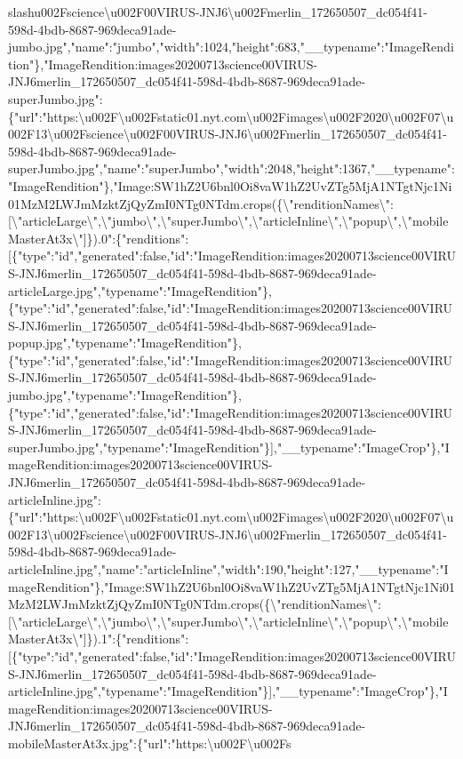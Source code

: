 slash{}u002Fscience\textbackslash{}u002F00VIRUS-JNJ6\textbackslash{}u002Fmerlin\_172650507\_dc054f41-598d-4bdb-8687-969deca91ade-jumbo.jpg","name":"jumbo","width":1024,"height":683,"\_\_typename":"ImageRendition"\},"ImageRendition:images20200713science00VIRUS-JNJ6merlin\_172650507\_dc054f41-598d-4bdb-8687-969deca91ade-superJumbo.jpg":\{"url":"https:\textbackslash{}u002F\textbackslash{}u002Fstatic01.nyt.com\textbackslash{}u002Fimages\textbackslash{}u002F2020\textbackslash{}u002F07\textbackslash{}u002F13\textbackslash{}u002Fscience\textbackslash{}u002F00VIRUS-JNJ6\textbackslash{}u002Fmerlin\_172650507\_dc054f41-598d-4bdb-8687-969deca91ade-superJumbo.jpg","name":"superJumbo","width":2048,"height":1367,"\_\_typename":"ImageRendition"\},"Image:SW1hZ2U6bnl0Oi8vaW1hZ2UvZTg5MjA1NTgtNjc1Ni01MzM2LWJmMzktZjQyZmI0NTg0NTdm.crops(\{\textbackslash{}"renditionNames\textbackslash{}":{[}\textbackslash{}"articleLarge\textbackslash{}",\textbackslash{}"jumbo\textbackslash{}",\textbackslash{}"superJumbo\textbackslash{}",\textbackslash{}"articleInline\textbackslash{}",\textbackslash{}"popup\textbackslash{}",\textbackslash{}"mobileMasterAt3x\textbackslash{}"{]}\}).0":\{"renditions":{[}\{"type":"id","generated":false,"id":"ImageRendition:images20200713science00VIRUS-JNJ6merlin\_172650507\_dc054f41-598d-4bdb-8687-969deca91ade-articleLarge.jpg","typename":"ImageRendition"\},\{"type":"id","generated":false,"id":"ImageRendition:images20200713science00VIRUS-JNJ6merlin\_172650507\_dc054f41-598d-4bdb-8687-969deca91ade-popup.jpg","typename":"ImageRendition"\},\{"type":"id","generated":false,"id":"ImageRendition:images20200713science00VIRUS-JNJ6merlin\_172650507\_dc054f41-598d-4bdb-8687-969deca91ade-jumbo.jpg","typename":"ImageRendition"\},\{"type":"id","generated":false,"id":"ImageRendition:images20200713science00VIRUS-JNJ6merlin\_172650507\_dc054f41-598d-4bdb-8687-969deca91ade-superJumbo.jpg","typename":"ImageRendition"\}{]},"\_\_typename":"ImageCrop"\},"ImageRendition:images20200713science00VIRUS-JNJ6merlin\_172650507\_dc054f41-598d-4bdb-8687-969deca91ade-articleInline.jpg":\{"url":"https:\textbackslash{}u002F\textbackslash{}u002Fstatic01.nyt.com\textbackslash{}u002Fimages\textbackslash{}u002F2020\textbackslash{}u002F07\textbackslash{}u002F13\textbackslash{}u002Fscience\textbackslash{}u002F00VIRUS-JNJ6\textbackslash{}u002Fmerlin\_172650507\_dc054f41-598d-4bdb-8687-969deca91ade-articleInline.jpg","name":"articleInline","width":190,"height":127,"\_\_typename":"ImageRendition"\},"Image:SW1hZ2U6bnl0Oi8vaW1hZ2UvZTg5MjA1NTgtNjc1Ni01MzM2LWJmMzktZjQyZmI0NTg0NTdm.crops(\{\textbackslash{}"renditionNames\textbackslash{}":{[}\textbackslash{}"articleLarge\textbackslash{}",\textbackslash{}"jumbo\textbackslash{}",\textbackslash{}"superJumbo\textbackslash{}",\textbackslash{}"articleInline\textbackslash{}",\textbackslash{}"popup\textbackslash{}",\textbackslash{}"mobileMasterAt3x\textbackslash{}"{]}\}).1":\{"renditions":{[}\{"type":"id","generated":false,"id":"ImageRendition:images20200713science00VIRUS-JNJ6merlin\_172650507\_dc054f41-598d-4bdb-8687-969deca91ade-articleInline.jpg","typename":"ImageRendition"\}{]},"\_\_typename":"ImageCrop"\},"ImageRendition:images20200713science00VIRUS-JNJ6merlin\_172650507\_dc054f41-598d-4bdb-8687-969deca91ade-mobileMasterAt3x.jpg":\{"url":"https:\textbackslash{}u002F\textbackslash{}u002Fs